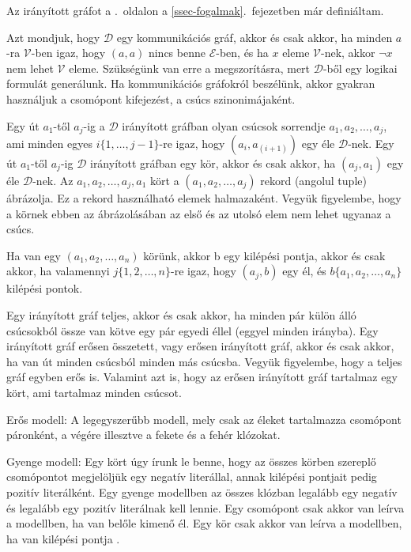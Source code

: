 \documentclass[
]{thesis-ekf}
\theoremstyle{definition}
\theoremstyle{remark}
\begin{document}
	Az irányított gráfot a \pageref{ssec-fogalmak}.~oldalon a \ref{ssec-fogalmak}.~fejezetben már definiáltam.
	
	Azt mondjuk, hogy $ \mathcal{D} $ egy kommunikációs gráf, akkor és csak akkor, ha minden $ a $-ra $ \mathcal{V} $-ben igaz, hogy $ (a,a) $ nincs benne $ \mathcal{E} $-ben, és ha $ x $ eleme $ \mathcal{V} $-nek, akkor $ \neg x $ nem lehet $ \mathcal{V} $ eleme. Szükségünk van erre a megszorításra, mert $ \mathcal{D} $-ből egy logikai formulát generálunk. Ha kommunikációs gráfokról beszélünk, akkor gyakran használjuk a csomópont kifejezést, a csúcs szinonimájaként.

	Egy út $ a_1 $-től $ a_j $-ig a $ \mathcal{D} $ irányított gráfban olyan csúcsok sorrendje $ a_1,a_2,\dots,a_j $, ami minden egyes $ i\{1,\dots,j-1\} $-re igaz, hogy $ (a_i,a_(i+1)) $ egy éle $ \mathcal{D} $-nek. Egy út $ a_1 $-től $ a_j $-ig $ \mathcal{D} $ irányított gráfban egy kör, akkor és csak akkor, ha $ (a_j,a_1) $ egy éle $ \mathcal{D} $-nek. Az $ a_1,a_2,\dots,a_j,a_1 $ kört a $ (a_1,a_2,\dots,a_j ) $ rekord (angolul tuple) ábrázolja. Ez a rekord használható elemek halmazaként. Vegyük figyelembe, hogy a körnek ebben az ábrázolásában az első és az utolsó elem nem lehet ugyanaz a csúcs.

	Ha van egy $ (a_1,a_2,\dots,a_n) $ körünk, akkor b egy kilépési pontja, akkor és csak akkor, ha valamennyi $ j\{1,2,\dots,n\} $-re igaz, hogy $ (a_j,b) $ egy él, és $ b\{a_1,a_2,\dots,a_n\} $ kilépési pontok.

	Egy irányított gráf teljes, akkor és csak akkor, ha minden pár külön álló csúcsokból össze van kötve egy pár egyedi éllel (eggyel minden irányba). Egy irányított gráf erősen összetett, vagy erősen irányított gráf, akkor és csak akkor, ha van út minden csúcsból minden más csúcsba. Vegyük figyelembe, hogy a teljes gráf egyben erős is. Valamint azt is, hogy az erősen irányított gráf tartalmaz egy kört, ami tartalmaz minden csúcsot.
	\cite[fordítás Kusper Gábor és társainak cikkjéből]{am}

	Erős modell: A legegyszerűbb modell, mely csak az éleket tartalmazza csomópont páronként, a végére illesztve a fekete és a fehér klózokat.
	
	Gyenge modell: Egy kört úgy írunk le benne, hogy az összes körben szereplő csomópontot megjelöljük egy negatív literállal, annak kilépési pontjait pedig pozitív literálként. Egy gyenge modellben az összes klózban legalább egy negatív és legalább egy pozitív literálnak kell lennie. Egy csomópont csak akkor van leírva a modellben, ha van belőle kimenő él. Egy kör csak akkor van leírva a modellben, ha van kilépési pontja \cite{sat-solving-50}.
	
\end{document}
